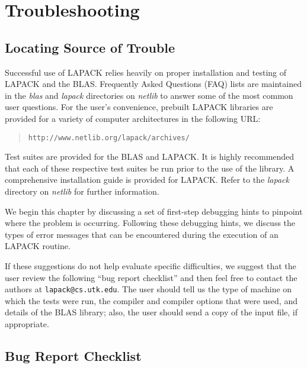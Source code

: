 \chapter{Troubleshooting}\label{troubleshooting}


\section{Locating Source of Trouble}

Successful use of LAPACK relies heavily on proper installation
and testing of LAPACK and the BLAS.  Frequently Asked Questions (FAQ) lists
are maintained in the {\em blas} and {\em lapack} directories on {\em netlib}
to answer some of the most common user questions.  For the user's convenience,
prebuilt LAPACK libraries are provided for a variety of computer
architectures in the following URL:
\begin{quote}
{\tt http://www.netlib.org/lapack/archives/}
\end{quote}
 
Test suites are provided for the BLAS and LAPACK.
It is highly recommended that each of these respective test
suites be run prior to the use of the library.
A comprehensive installation guide is
provided for LAPACK.  Refer to the {\em lapack} directory on {\em netlib} for
further information.

We begin this chapter by discussing a set of first-step debugging
hints to pinpoint where the problem is occurring.
Following these debugging hints, we discuss the types of
error messages that can be encountered during the execution of an LAPACK
routine.
 
If these suggestions do not help evaluate specific difficulties,
we suggest that the user review the following ``bug report checklist'' and then
feel free to contact the authors at {\tt lapack@cs.utk.edu}.
The user should tell us the type of machine
on which the tests were run, the compiler and compiler options that were
used, and details of the BLAS library; also, the user should send a copy of
the input file, if appropriate.

\section{Bug Report Checklist}
\label{checklist}
 
